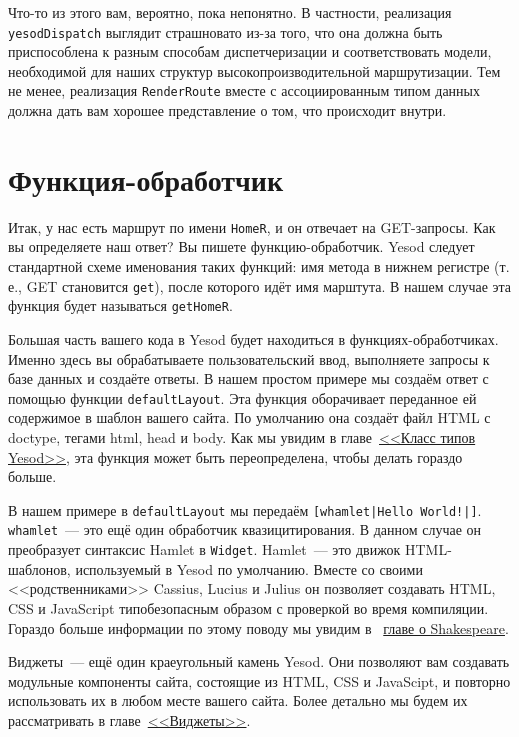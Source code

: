 Что-то из этого вам, вероятно, пока непонятно. В частности, реализация
\lstinline!yesodDispatch! выглядит страшновато из-за того, что она должна быть
приспособлена к разным способам диспетчеризации и соответствовать модели, необходимой для
наших структур высокопроизводительной маршрутизации. Тем не менее, реализация
\lstinline!RenderRoute! вместе с ассоциированным типом данных должна дать вам хорошее
представление о том, что происходит внутри.

\section{Функция-обработчик}

Итак, у нас есть маршрут по имени \lstinline!HomeR!, и он отвечает на GET-запросы.  Как вы
определяете наш ответ? Вы пишете функцию-обработчик. Yesod следует стандартной схеме
именования таких функций: имя метода в нижнем регистре (т. е., GET становится
\lstinline!get!), после которого идёт имя марштута. В нашем случае эта функция будет
называться \lstinline!getHomeR!.

Большая часть вашего кода в Yesod будет находиться в функциях-обработчиках.  Именно здесь
вы обрабатываете пользовательский ввод, выполняете запросы к базе данных и создаёте
ответы. В нашем простом примере мы создаём ответ с помощью функции
\lstinline!defaultLayout!. Эта функция оборачивает переданное ей содержимое в шаблон
вашего сайта. По умолчанию она создаёт файл HTML с doctype, тегами html, head и body. Как
мы увидим в главе~\hyperref[chap:yesod-typeclass]{<<Класс типов Yesod>>}, эта функция может
быть переопределена, чтобы делать гораздо больше.

В нашем примере в \lstinline!defaultLayout! мы передаём
\lstinline'[whamlet|Hello World!|]'. \lstinline!whamlet!~--- это ещё один обработчик
квазицитирования. В данном случае он преобразует синтаксис Hamlet в
\texttt{Widget}. Hamlet~--- это движок HTML-шаблонов, используемый в Yesod по умолчанию.
Вместе со своими <<родственниками>> Cassius, Lucius и Julius он позволяет создавать HTML,
CSS и JavaScript типобезопасным образом с проверкой во время компиляции. Гораздо больше
информации по этому поводу мы увидим в ~\hyperref[chap:shakespeare]{главе о Shakespeare}.

Виджеты~--- ещё один краеугольный камень Yesod. Они позволяют вам создавать
модульные компоненты сайта, состоящие из HTML, CSS и JavaScipt,
и повторно использовать их в любом месте вашего сайта. Более детально мы будем их
рассматривать в главе~\hyperref[chap:widgets]{<<Виджеты>>}.

